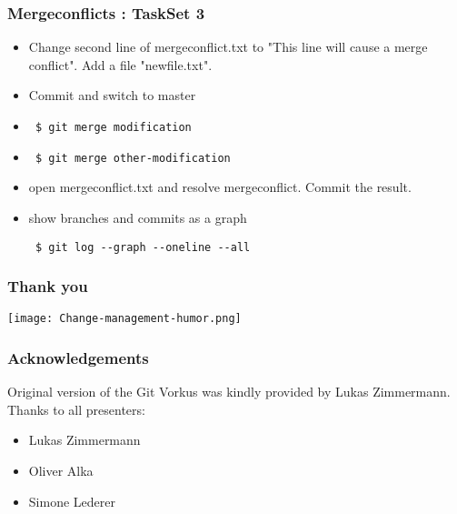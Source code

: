 \documentclass{beamer} %
\begin{document}
\begin{frame}[t, fragile]
\frametitle{Mergeconflicts : TaskSet 3}
\begin{itemize}
\item Change second line of mergeconflict.txt to "This line will cause a merge conflict". Add a file "newfile.txt". 
\item Commit and switch to master 
\item \begin{verbatim} 
 $ git merge modification
 \end{verbatim}
 \item \begin{verbatim} 
 $ git merge other-modification
 \end{verbatim}
 \item open mergeconflict.txt and resolve mergeconflict. Commit the result.
 \item show branches and commits as a graph \begin{verbatim}
 $ git log --graph --oneline --all
 \end{verbatim}
\end{itemize}
\end{frame}


\begin{frame}
\frametitle{Thank you}

\begin{center}
	\texttt{[image: Change-management-humor.png]}
\end{center}

\end{frame}

\begin{frame}
\frametitle{Acknowledgements}

Original version of the Git Vorkus was kindly provided by 
Lukas Zimmermann. \\

Thanks to all presenters:
\begin{itemize}
\item Lukas Zimmermann
\item Oliver Alka 
\item Simone Lederer
\end{itemize}


\end{frame}
\end{document}
